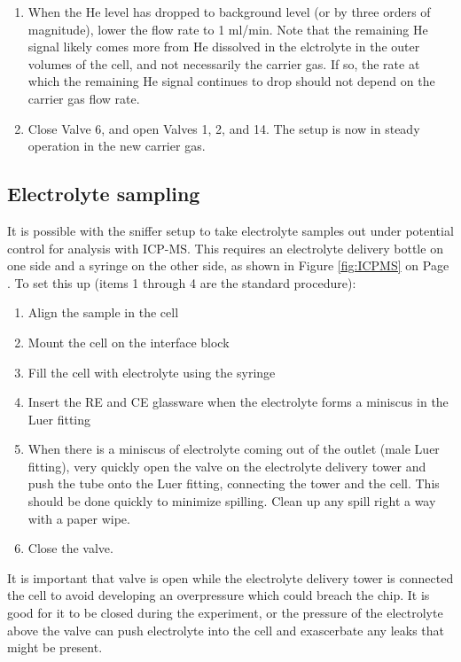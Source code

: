 \begin{enumerate}
	\item When the He level has dropped to background level (or by three orders of magnitude), lower the  flow rate to 1 ml/min. Note that the remaining He signal likely comes more from He dissolved in the elctrolyte in the outer volumes of the cell, and not necessarily the carrier gas. If so, the rate at which the remaining He signal continues to drop should not depend on the carrier gas flow rate.
	
	\item Close Valve 6, and open Valves 1, 2, and 14. The setup is now in steady operation in the new carrier gas.
	
\end{enumerate}


\subsection{Electrolyte sampling}\label{app:sampling}

It is possible with the sniffer setup to take electrolyte samples out under potential control for analysis with ICP-MS. This requires an electrolyte delivery bottle on one side and a syringe on the other side, as shown in Figure \ref{fig:ICPMS} on Page \pageref{fig:ICPMS}. To set this up (items 1 through 4 are the standard procedure):
\begin{enumerate}
	\item Align the sample in the cell
	
	\item Mount the cell on the interface block
	
	\item Fill the cell with electrolyte using the syringe
	
	\item Insert the RE and CE glassware when the electrolyte forms a miniscus in the Luer fitting
	
	\item When there is a miniscus of electrolyte coming out of the outlet (male Luer fitting), very quickly open the valve on the electrolyte delivery tower and push the tube onto the Luer fitting, connecting the tower and the cell. This should be done quickly to minimize spilling. Clean up any spill right a way with a paper wipe.
	
	\item Close the valve.
\end{enumerate}

It is important that valve is open while the electrolyte delivery tower is connected the cell to avoid developing an overpressure which could breach the chip. It is good for it to be closed during the experiment, or the pressure of the electrolyte above the valve can push electrolyte into the cell and exascerbate any leaks that might be present.

